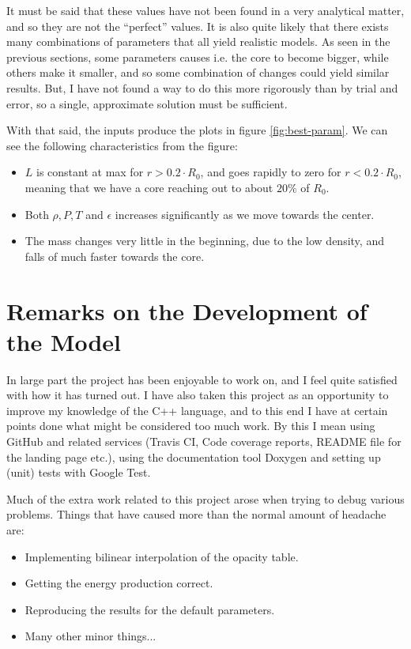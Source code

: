 \documentclass[11pt,twocolumn]{article}
\begin{document}
It must be said that these values have not been found in a very
analytical matter, and so they are not the ``perfect'' values. It is also
quite likely that there exists many combinations of parameters that
all yield realistic models. As seen in the previous sections, some
parameters causes i.e. the core to become bigger, while others make it
smaller, and so some combination of changes could yield similar
results. But, I have not found a way to do this more rigorously than
by trial and error, so a single, approximate solution must be
sufficient.

With that said, the inputs produce the plots in figure
\ref{fig:best-param}. We can see the following characteristics from
the figure:

\begin{itemize}
  \item $L$ is constant at max for $r>0.2\cdot R_0$, and goes rapidly
    to zero for $r<0.2 \cdot R_0$, meaning that we have a core
    reaching out to about $20\%$ of $R_0$.
  \item Both $\rho,P,T$ and $\epsilon$ increases significantly as we move
    towards the center.
  \item The mass changes very little in the beginning, due to the low
    density, and falls of much faster towards the core. 
\end{itemize}





\section{Remarks on the Development of the Model}
In large part the project has been enjoyable to work on, and I feel
quite satisfied with how it has turned out. I have also taken this
project as an opportunity to improve my knowledge of the C++ language,
and to this end I have at certain points done what might be considered
too much work. By this I mean using GitHub and related services
(Travis CI, Code coverage reports, README file for the landing page
etc.), using the documentation tool Doxygen and setting up
(unit) tests with Google Test. 

Much of the extra work related to this project arose when trying to
debug various problems. Things that have caused more than the normal
amount of headache are:

\begin{itemize}
  \item Implementing bilinear interpolation of the opacity table.
  \item Getting the energy production correct.
  \item Reproducing the results for the default parameters.
  \item Many other minor things...
\end{itemize}
\end{document}

